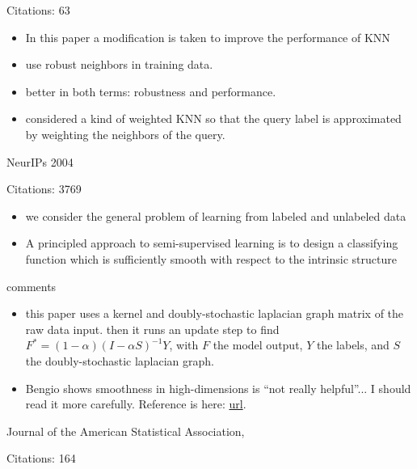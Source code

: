 \documentclass[11pt]{article}
\begin{document}
\noindent Citations: 63

\begin{itemize}
\item In this paper a modification is taken to improve the performance of KNN
\item use robust neighbors in training data.
\item better in both terms: robustness and performance.
\item considered a kind of weighted KNN so that the query label is approximated by weighting the neighbors of the query.
\end{itemize}

\vspace{2cm}

\noindent NeurIPs 2004

\noindent Citations: 3769

\begin{itemize}
\item we consider the general problem of learning from labeled and unlabeled data
\item A principled approach to semi-supervised learning is to design a classifying function which is sufficiently smooth with respect to the intrinsic structure 
\end{itemize}

\noindent comments
\begin{itemize}
\item this paper uses a kernel and doubly-stochastic laplacian graph matrix of the raw data input. then it runs an update step to find $F^* = (1 - \alpha)(I - \alpha S)^{-1}Y$, with $F$ the model output, $Y$ the labels, and $S$ the doubly-stochastic laplacian graph.
\item Bengio shows smoothness in high-dimensions is ``not really helpful''... I should read it more carefully. Reference is here: \href{http://cseweb.ucsd.edu/~gary/cs200/s12/bengio-lecun-07.pdf}{url}.
\end{itemize}


\vspace{2cm} 

\noindent Journal of the American Statistical Association, 

\noindent Citations: 164
\end{document}
